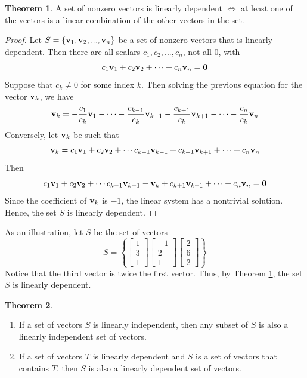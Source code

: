 \documentclass{article}
\theoremstyle{definition}
\newtheorem{theorem}{Theorem}
\newcommand{\bmat}[1]{\begin{bmatrix}#1\end{bmatrix}}
\begin{document}
\begin{theorem}
	\label{lindep_lincomb}
	A set of nonzero vectors is linearly dependent $\iff$ at least one of the vectors is a linear combination of the other vectors in the set.
	\begin{proof}
		Let $S = \{ \vb{v}_1, \vb{v}_2, ..., \vb{v}_n \}$ be a set of nonzero vectors that is linearly dependent. Then there are all scalars $c_1, c_2, ..., c_n$, not all 0, with
		\[ c_1\vb{v}_1 + c_2\vb{v}_2 + \cdots + c_n\vb{v}_n = \vb{0} \]
		Suppose that $c_k \neq 0$ for some index $k$. Then solving the previous equation for the vector $\vb{v}_k$, we have
		\[ \vb{v}_k = -\frac{c_1}{c_k}\vb{v}_1 - \cdots - \frac{c_{k-1}}{c_k}\vb{v}_{k-1} - \frac{c_{k+1}}{c_k}\vb{v}_{k+1} - \cdots - \frac{c_n}{c_k}\vb{v}_n \]
		\indent Conversely, let $\vb{v}_k$ be such that
		\[ \vb{v}_k = c_1\vb{v}_1 + c_2\vb{v}_2 + \cdots c_{k-1}\vb{v}_{k-1} + c_{k+1}\vb{v}_{k+1} + \cdots + c_n\vb{v}_n \]
		Then
		\[ c_1\vb{v}_1 + c_2\vb{v}_2 + \cdots c_{k-1}\vb{v}_{k-1} - \vb{v}_k + c_{k+1}\vb{v}_{k+1} + \cdots + c_n\vb{v}_n = \vb{0}\]
		Since the coefficient of $\vb{v}_k$ is $-1$, the linear system has a nontrivial solution. Hence, the set $S$ is linearly dependent.
	\end{proof}
\end{theorem}
\indent As an illustration, let $S$ be the set of vectors
\[ S = \left\{ \bmat{1\\3\\1}\bmat{-1\\2\\1} \bmat{2\\6\\2} \right\} \]
Notice that the third vector is twice the first vector. Thus, by Theorem \ref{lindep_lincomb}, the set $S$ is linearly dependent.

\begin{theorem}
	$\;$
	\begin{enumerate}[itemsep=0pt,parsep=0.5pt]
		\item[$\vb{1.}$] If a set of vectors $S$ is linearly independent, then any subset of $S$ is also a linearly independent set of vectors.
		\item[$\vb{2.}$] If a set of vectors $T$ is linearly dependent and $S$ is a set of vectors that contains $T$, then $S$ is also a linearly dependent set of vectors.
	\end{enumerate}
\end{theorem}
\end{document}
